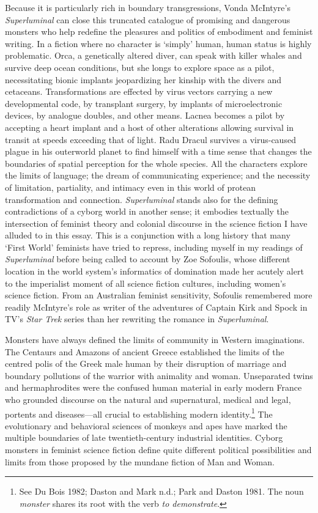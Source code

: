\documentclass[DIV=12,%
               BCOR=10mm,%
               headinclude=false,%
               footinclude=false,open=any,%
               fontsize=11pt,%
               twoside,%
               paper=210mm:11in]%
               {scrbook}
\begin{document}
Because it is particularly rich in boundary transgressions, Vonda McIntyre’s \emph{Superluminal} can close this truncated catalogue of promising and dangerous monsters who help redefine the pleasures and politics of embodiment and feminist writing. In a fiction where no character is ‘simply’ human, human status is highly problematic. Orca, a genetically altered diver, can speak with killer whales and survive deep ocean conditions, but she longs to explore space as a pilot, necessitating bionic implants jeopardizing her kinship with the divers and cetaceans. Transformations are effected by virus vectors carrying a new developmental code, by transplant surgery, by implants of microelectronic devices, by analogue doubles, and other means. Lacnea becomes a pilot by accepting a heart implant and a host of other alterations allowing survival in transit at speeds exceeding that of light. Radu Dracul survives a virus-caused plague in his outerworld planet to find himself with a time sense that changes the boundaries of spatial perception for the whole species. All the characters explore the limits of language; the dream of communicating experience; and the necessity of limitation, partiality, and intimacy even in this world of protean transformation and connection. \emph{Superluminal} stands also for the defining contradictions of a cyborg world in another sense; it embodies textually the intersection of feminist theory and colonial discourse in the science fiction I have alluded to in this essay. This is a conjunction with a long history that many ‘First World’ feminists have tried to repress, including myself in my readings of \emph{Superluminal} before being called to account by Zoe Sofoulis, whose different location in the world system’s informatics of domination made her acutely alert to the imperialist moment of all science fiction cultures, including women’s science fiction. From an Australian feminist sensitivity, Sofoulis remembered more readily McIntyre’s role as writer of the adventures of Captain Kirk and Spock in TV’s \emph{Star Trek} series than her rewriting the romance in \emph{Superluminal}.


Monsters have always defined the limits of community in Western imaginations. The Centaurs and Amazons of ancient Greece established the limits of the centred polis of the Greek male human by their disruption of marriage and boundary pollutions of the warrior with animality and woman. Unseparated twins and hermaphrodites were the confused human material in early modern France who grounded discourse on the natural and supernatural, medical and legal, portents and diseases—all crucial to establishing modern identity.\footnote{See Du Bois 1982; Daston and Mark n.d.; Park and Daston 1981. The noun \emph{monster} shares its root with the verb \emph{to demonstrate}.} The evolutionary and behavioral sciences of monkeys and apes have marked the multiple boundaries of late twentieth-century industrial identities. Cyborg monsters in feminist science fiction define quite different political possibilities and limits from those proposed by the mundane fiction of Man and Woman.
\end{document}
